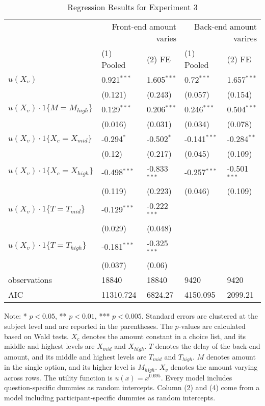 \documentclass[12pt]{article}
\begin{document}
\begin{table}
    \caption{Regression Results for Experiment 3}
    \vspace*{12pt}
    \centering

      \begin{tabular}{lllll}
\hline
 & \multicolumn{2}{r}{Front-end amount varies} & \multicolumn{2}{r}{Back-end amount varires} \\
 & (1) Pooled & (2) FE & (1) Pooled & (2) FE \\
\hline
$u(X_v)$ & 0.921$^{***}$ & 1.605$^{***}$ & 0.72$^{***}$ & 1.657$^{***}$ \\
 & (0.121) & (0.243) & (0.057) & (0.154) \\
$u(X_v)\cdot1\{M=M_{high}\}$ & 0.129$^{***}$ & 0.206$^{***}$ & 0.246$^{***}$ & 0.504$^{***}$ \\
 & (0.016) & (0.031) & (0.034) & (0.078) \\
$u(X_v)\cdot1\{X_c=X_{mid}\}$ & -0.294$^{*}$ & -0.502$^{*}$ & -0.141$^{***}$ & -0.284$^{**}$ \\
 & (0.12) & (0.217) & (0.045) & (0.109) \\
$u(X_v)\cdot1\{X_c=X_{high}\}$ & -0.498$^{***}$ & -0.833$^{***}$ & -0.257$^{***}$ & -0.501$^{***}$ \\
 & (0.119) & (0.223) & (0.046) & (0.109) \\
$u(X_v)\cdot1\{T=T_{mid}\}$ & -0.129$^{***}$ & -0.222$^{***}$ &  &  \\
 & (0.029) & (0.048) &  &  \\
$u(X_v)\cdot1\{T=T_{high}\}$ & -0.181$^{***}$ & -0.325$^{***}$ &  &  \\
 & (0.037) & (0.06) &  &  \\\hline

observations & 18840 & 18840 & 9420 & 9420 \\
AIC & 11310.724 & 6824.27 & 4150.095 & 2099.21 \\
\hline
\end{tabular}

    \vspace*{4pt}
    \centering
    \begin{minipage}{0.85\textwidth}
    {\par\footnotesize Note: * $p<0.05$, ** $p<0.01$, *** $p<0.005$. Standard errors are clustered at the subject level and are reported in the parentheses. The $p$-values are calculated based on Wald tests. $X_c$ denotes the amount constant in a choice list, and its middle and highest levels are $X_{mid}$ and $X_{high}$. $T$ denotes the delay of the back-end amount, and its middle and highest levels are $T_{mid}$ and $T_{high}$. $M$ denotes amount in the single option, and its higher level is $M_{high}$. $X_v$ denotes the amount varying across rows. The utility function is $u(x)=x^{0.695}$.  Every model includes question-specific dummies as random intercepts. Column (2) and (4) come from a model including participant-specific dummies as random intercepts.}
    \end{minipage}
    \label{tab:exp1_reg_utility}
\end{table}
\end{document}
